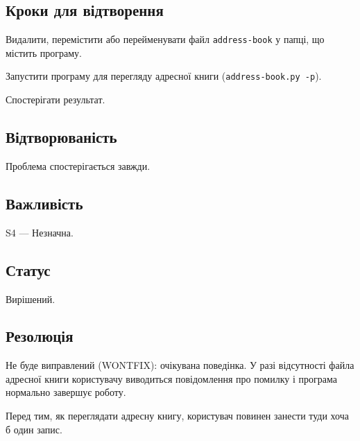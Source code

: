 \documentclass[a4paper,oneside,DIV=12,12pt]{scrartcl}
\newcommand\filename[1]{\texttt{#1}}
\begin{document}
		\subsection{Кроки для відтворення}
			\begin{steps}
				\item Видалити, перемістити або перейменувати файл \filename{address-book} у папці, що містить програму.
				
				\item Запустити програму для перегляду адресної книги (\verb+address-book.py -p+).
				
				\item Спостерігати результат.
			\end{steps}
			
		\subsection{Відтворюваність}
			Проблема спостерігається завжди.
			
		\subsection{Важливість}
			S4 — Незначна.
			
		\subsection{Статус}
			Вирішений.
			
		\subsection{Резолюція}
			Не буде виправлений (WONTFIX): очікувана поведінка. У разі відсутності файла адресної книги користувачу виводиться повідомлення про помилку і програма нормально завершує роботу.
			
			Перед тим, як переглядати адресну книгу, користувач повинен занести туди хоча б один запис.
\end{document}
